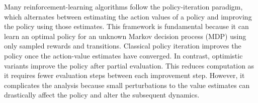 \documentclass[twoside,11pt]{article}
\begin{document}
Many reinforcement-learning algorithms follow the policy-iteration paradigm, which alternates between 
estimating the action values of a policy 
and improving the policy using those estimates. 
This framework is fundamental because it can learn an optimal policy for an unknown Markov decision process (MDP) using only sampled rewards and transitions.
Classical policy iteration improves the policy once the action-value estimates have converged.
In contrast, optimistic variants improve the policy after partial evaluation.
This reduces computation as it requires fewer evaluation steps between each improvement step.
However, it complicates the analysis because 
small perturbations 
to the value estimates
can drastically affect the policy and alter the subsequent dynamics.


% 
\end{document}
